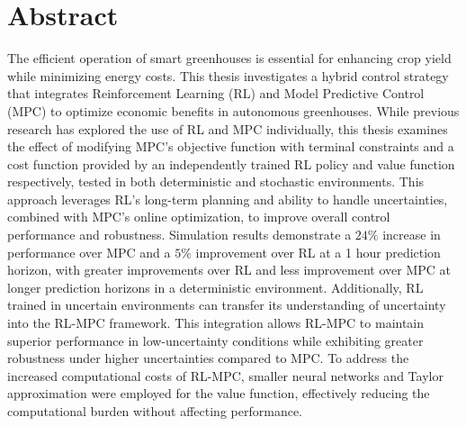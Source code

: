 \chapter*{Abstract}


      The efficient operation of smart greenhouses is essential for enhancing crop yield while minimizing energy costs. This thesis investigates a hybrid control strategy that integrates Reinforcement Learning (RL) and Model Predictive Control (MPC) to optimize economic benefits in autonomous greenhouses. While previous research has explored the use of RL and MPC individually, this thesis examines the effect of modifying MPC’s objective function with terminal constraints and a cost function provided by an independently trained RL policy and value function respectively, tested in both deterministic and stochastic environments. This approach leverages RL's long-term planning and ability to handle uncertainties, combined with MPC’s online optimization, to improve overall control performance and robustness. Simulation results demonstrate a $24\%$ increase in performance over MPC and a $5\%$ improvement over RL at a 1 hour prediction horizon, with greater improvements over RL and less improvement over MPC at longer prediction horizons in a deterministic environment.  Additionally, RL trained in uncertain environments can transfer its understanding of uncertainty into the RL-MPC framework. This integration allows RL-MPC to maintain superior performance in low-uncertainty conditions while exhibiting greater robustness under higher uncertainties compared to MPC. To address the increased computational costs of RL-MPC, smaller neural networks  and Taylor approximation were employed for the value function, effectively reducing the computational burden without affecting performance.
      
      
      